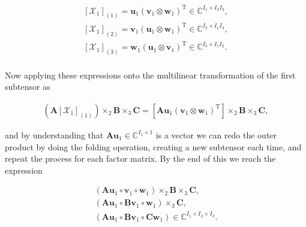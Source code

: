 \documentclass[a4paper,10pt]{article}
\begin{document}
\begin{enumerate}
\begin{enumerate}
                \begin{align}
                    \left[\mathcal{X}_{1}\right]_{(1)} = \boldsymbol{u}_{1} (\boldsymbol{v}_{1} \otimes \boldsymbol{w}_{1})^{\text{T}} \in \mathbb{C}^{I_{1} \times I_{2} I_{3}}, \\
                    \left[\mathcal{X}_{1}\right]_{(2)} = \boldsymbol{v}_{1} (\boldsymbol{u}_{1} \otimes \boldsymbol{w}_{1})^{\text{T}} \in \mathbb{C}^{I_{2} \times I_{1} I_{3}}, \\
                    \left[\mathcal{X}_{1}\right]_{(3)} = \boldsymbol{w}_{1} (\boldsymbol{u}_{1} \otimes \boldsymbol{v}_{1})^{\text{T}} \in \mathbb{C}^{I_{3} \times I_{1} I_{2}}.
                \end{align}
                
                \paragraph{}Now applying these expressions onto the multilinear transformation of the first subtensor as
                
                \begin{align}
                    \left( \boldsymbol{A} \left[\mathcal{X}_{1}\right]_{(1)} \right) \times_{2} \boldsymbol{B} \times_{3} \boldsymbol{C} = \left[ \boldsymbol{A}\boldsymbol{u}_{1} (\boldsymbol{v}_{1} \otimes \boldsymbol{w}_{1})^{\text{T}}  \right] \times_{2} \boldsymbol{B} \times_{3} \boldsymbol{C},
                \end{align}
                
                and by understanding that $\boldsymbol{A}\boldsymbol{u}_{1} \in \mathbb{C}^{I_{1} \times 1}$ is a vector we can redo the outer product by doing the folding operation, creating a new subtensor each time, and repeat the process for each factor matrix. By the end of this we reach the expression 
                
                \begin{align}
                    \left( \boldsymbol{A} \boldsymbol{u}_{1} \circ \boldsymbol{v}_{1} \circ \boldsymbol{w}_{1} \right) \times_{2} \boldsymbol{B} \times_{3} \boldsymbol{C}, \\
                    \left( \boldsymbol{A} \boldsymbol{u}_{1} \circ \boldsymbol{B} \boldsymbol{v}_{1} \circ \boldsymbol{w}_{1} \right) \times_{3} \boldsymbol{C}, \\
                    \left( \boldsymbol{A} \boldsymbol{u}_{1} \circ \boldsymbol{B} \boldsymbol{v}_{1} \circ \boldsymbol{C} \boldsymbol{w}_{1} \right) \in \mathbb{C}^{I_{1} \times I_{2} \times I_{3}}.
                \end{align}
                

\end{enumerate}
\end{enumerate}
\end{document}
